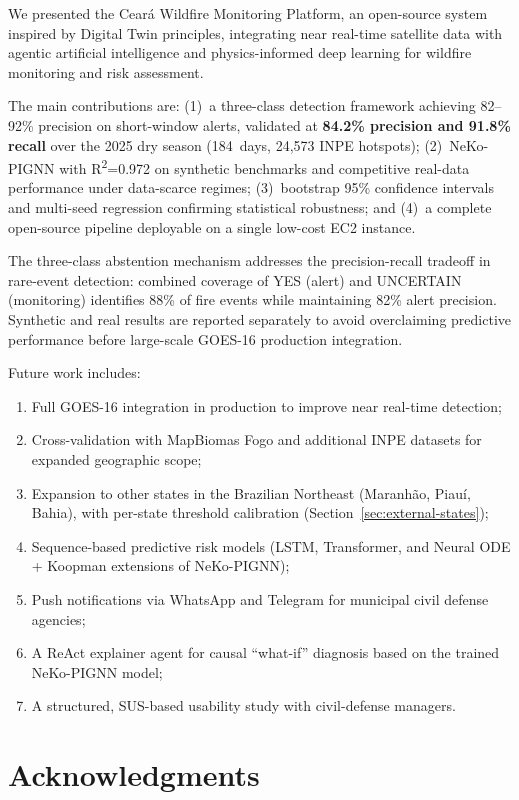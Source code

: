 \documentclass[preprint,12pt,times,numbers]{elsarticle}
\begin{document}
We presented the Ceará Wildfire Monitoring Platform, an open-source system inspired by Digital Twin principles, integrating near real-time satellite data with agentic artificial intelligence and physics-informed deep learning for wildfire monitoring and risk assessment.

The main contributions are: (1)~a three-class detection framework achieving 82--92\% precision on short-window alerts, validated at \textbf{84.2\% precision and 91.8\% recall} over the 2025 dry season (184~days, 24{,}573 INPE hotspots); (2)~NeKo-PIGNN with R\textsuperscript{2}=0.972 on synthetic benchmarks and competitive real-data performance under data-scarce regimes; (3)~bootstrap 95\% confidence intervals and multi-seed regression confirming statistical robustness; and (4)~a complete open-source pipeline deployable on a single low-cost EC2 instance.

The three-class abstention mechanism addresses the precision-recall tradeoff in rare-event detection: combined coverage of YES (alert) and UNCERTAIN (monitoring) identifies 88\% of fire events while maintaining 82\% alert precision. Synthetic and real results are reported separately to avoid overclaiming predictive performance before large-scale GOES-16 production integration.

Future work includes:

\begin{enumerate}
    \item Full GOES-16 integration in production to improve near real-time detection;
    \item Cross-validation with MapBiomas Fogo and additional INPE datasets for expanded geographic scope;
    \item Expansion to other states in the Brazilian Northeast (Maranhão, Piauí, Bahia), with per-state threshold calibration (Section~\ref{sec:external-states});
    \item Sequence-based predictive risk models (LSTM, Transformer, and Neural ODE + Koopman extensions of NeKo-PIGNN);
    \item Push notifications via WhatsApp and Telegram for municipal civil defense agencies;
    \item A ReAct explainer agent for causal ``what-if'' diagnosis based on the trained NeKo-PIGNN model;
    \item A structured, SUS-based usability study with civil-defense managers.
\end{enumerate}

\section*{Acknowledgments}
\end{document}
